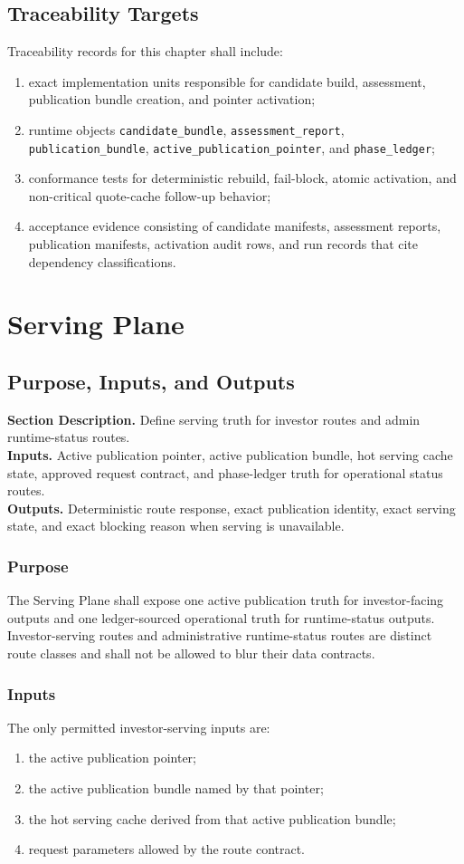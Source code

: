 \documentclass[11pt]{report}
\newcommand{\meta}[3]{\textbf{Section Description.} #1\\
\textbf{Inputs.} #2\\
\textbf{Outputs.} #3\par}
\begin{document}
\section{Traceability Targets}
Traceability records for this chapter shall include:
\begin{enumerate}[leftmargin=1.2cm]
    \item exact implementation units responsible for candidate build, assessment, publication bundle creation, and pointer activation;
    \item runtime objects \texttt{candidate\_bundle}, \texttt{assessment\_report}, \texttt{publication\_bundle}, \texttt{active\_publication\_pointer}, and \texttt{phase\_ledger};
    \item conformance tests for deterministic rebuild, fail-block, atomic activation, and non-critical quote-cache follow-up behavior;
    \item acceptance evidence consisting of candidate manifests, assessment reports, publication manifests, activation audit rows, and run records that cite dependency classifications.
\end{enumerate}
\chapter{Serving Plane}
\section{Purpose, Inputs, and Outputs}
\meta{Define serving truth for investor routes and admin runtime-status routes.}{Active publication pointer, active publication bundle, hot serving cache state, approved request contract, and phase-ledger truth for operational status routes.}{Deterministic route response, exact publication identity, exact serving state, and exact blocking reason when serving is unavailable.}

\subsection{Purpose}
The Serving Plane shall expose one active publication truth for investor-facing outputs and one ledger-sourced operational truth for runtime-status outputs. Investor-serving routes and administrative runtime-status routes are distinct route classes and shall not be allowed to blur their data contracts.

\subsection{Inputs}
The only permitted investor-serving inputs are:
\begin{enumerate}[leftmargin=1.2cm]
    \item the active publication pointer;
    \item the active publication bundle named by that pointer;
    \item the hot serving cache derived from that active publication bundle;
    \item request parameters allowed by the route contract.
\end{enumerate}
\end{document}
